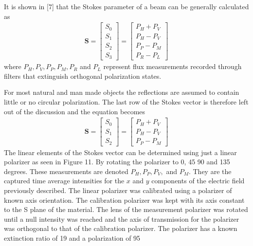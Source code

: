 It is shown in [7] that the Stokes parameter of a beam can be generally calculated as
%
\begin{align}
    \mathbf{S} =
    \begin{bmatrix}
        S_0 \\
        S_1 \\
        S_2 \\
        S_3
    \end{bmatrix}
    =
    \begin{bmatrix}
        P_H + P_V \\
        P_H - P_V \\
        P_P - P_M \\
        P_R - P_L
    \end{bmatrix}
\end{align}
%
where $P_H, P_V, P_P, P_M, P_R$ and $P_L$ represent flux measurements recorded through filters that extinguish orthogonal polarization states.

For most natural and man made objects the reflections are assumed to contain little or no circular polarization. The last row of the Stokes vector is therefore left out of the discussion and the equation becomes
%
\begin{align}
    \mathbf{S} =
    \begin{bmatrix}
        S_0 \\
        S_1 \\
        S_2
    \end{bmatrix}
    =
    \begin{bmatrix}
        P_H + P_V \\
        P_H - P_V \\
        P_P - P_M
    \end{bmatrix}
\end{align}
%
The linear elements of the Stokes vector can be determined using just a linear polarizer as seen in Figure 11.  By rotating the polarizer to 0, 45 90 and 135 degrees.  These measurements are denoted $P_H, P_P, P_V,$ and $P_M$. They are the captured time average intensities for the $x$ and $y$ components of the electric field previously described.
%
%
The linear polarizer was calibrated using a polarizer of known axis orientation.  The calibration polarizer was kept with its axis constant to the S plane of the material.  The lens of the measurement polarizer was rotated until a null intensity was reached and the axis of transmission for the polarizer was orthogonal to that of the calibration polarizer.  The polarizer has a known extinction ratio of 19 and a polarization of 95%

